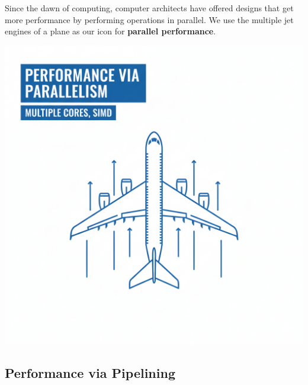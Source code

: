 \documentclass[a4paper,10pt]{article}
\begin{document}
\begin{minipage}[t]{0.7\linewidth}
Since the dawn of computing, computer architects have offered designs that get more performance by performing operations in parallel. We use the multiple jet engines of a plane as our icon for \textbf{parallel performance}.
\end{minipage}
\hfill
\begin{minipage}[t]{0.28\linewidth}
    \centering
    \includegraphics[width=\linewidth]{resources/8_great_ideas_of_computer_architecture/perf_via_parallelism.png}
\end{minipage}

\bigskip

\subsection{Performance via Pipelining}
\end{document}
